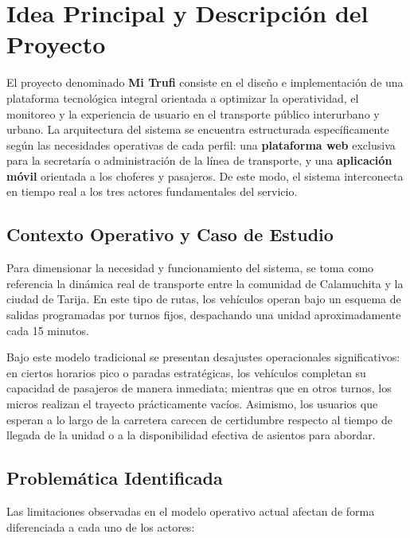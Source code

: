 \section{Idea Principal y Descripción del Proyecto}

El proyecto denominado \textbf{Mi Trufi} consiste en el diseño e implementación de una plataforma tecnológica integral orientada a optimizar la operatividad, el monitoreo y la experiencia de usuario en el transporte público interurbano y urbano. La arquitectura del sistema se encuentra estructurada específicamente según las necesidades operativas de cada perfil: una \textbf{plataforma web} exclusiva para la secretaría o administración de la línea de transporte, y una \textbf{aplicación móvil} orientada a los choferes y pasajeros. De este modo, el sistema interconecta en tiempo real a los tres actores fundamentales del servicio.

\subsection{Contexto Operativo y Caso de Estudio}

Para dimensionar la necesidad y funcionamiento del sistema, se toma como referencia la dinámica real de transporte entre la comunidad de Calamuchita y la ciudad de Tarija. En este tipo de rutas, los vehículos operan bajo un esquema de salidas programadas por turnos fijos, despachando una unidad aproximadamente cada 15 minutos. 

Bajo este modelo tradicional se presentan desajustes operacionales significativos: en ciertos horarios pico o paradas estratégicas, los vehículos completan su capacidad de pasajeros de manera inmediata; mientras que en otros turnos, los micros realizan el trayecto prácticamente vacíos. Asimismo, los usuarios que esperan a lo largo de la carretera carecen de certidumbre respecto al tiempo de llegada de la unidad o a la disponibilidad efectiva de asientos para abordar.

\subsection{Problemática Identificada}

Las limitaciones observadas en el modelo operativo actual afectan de forma diferenciada a cada uno de los actores:

